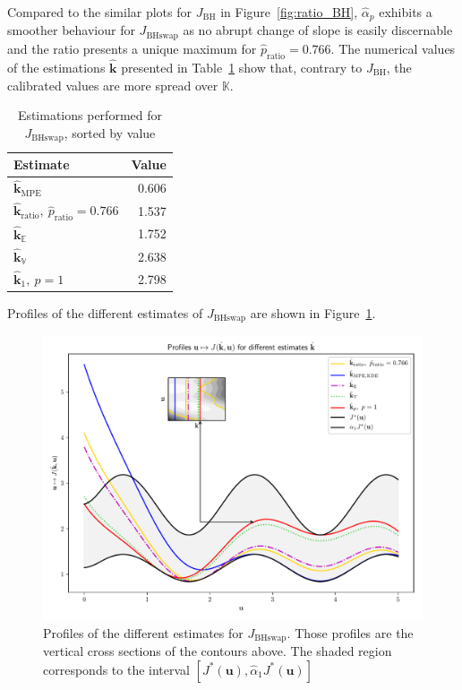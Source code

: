 \documentclass[preprint, 1p]{elsarticle}
\newcommand{\Ex}{\mathbb{E}}
\newcommand{\hatkmean}{\hat{\mathbf{k}}_{\Ex}}
\newcommand{\hatkvar}{\hat{\mathbf{k}}_{\mathbb{V}}}
\newcommand{\kest}{\hat{\mathbf{k}}}
\newcommand{\checka}{{\alpha}}
\newcommand{\Kspace}{\mathbb{K}}
\newcommand{\JBH}{J_{\mathrm{BH}}}
\newcommand{\JBHS}{J_{\mathrm{BHswap}}}
\newlength{\onehalfcolumn}
\begin{document}
Compared to the similar plots for $\JBH$ in Figure~\ref{fig:ratio_BH}, $\hat{\checka}_p$ exhibits a smoother behaviour for $\JBHS$ as no abrupt change of slope is easily discernable and the ratio presents a unique maximum for $\hat{p}_{\mathrm{ratio}}=0.766$. The numerical values of the estimations $\kest$ presented in Table~\ref{tab:recap_estimates_BHs} show that, contrary to $\JBH$, the calibrated values are more spread over $\Kspace$.

\begin{table}[!h]
\centering
\caption{Estimations performed for $\JBHS$, sorted by value}
\label{tab:recap_estimates_BHs}
\begin{tabular}{lr} \toprule
Estimate & Value \\ \midrule
$\kest_{\mathrm{MPE}}$ & 0.606 \\ 
$\kest_{\mathrm{ratio}},~ \hat{p}_{\mathrm{ratio}}=0.766$ & 1.537 \\ 
$\hatkmean$ & 1.752 \\ 
$\hatkvar$ & 2.638 \\ 
$\kest_1,~p=1$ & 2.798   \\ \bottomrule
\end{tabular}
\end{table}


Profiles of the different estimates of $\JBHS$ are shown in Figure~\ref{fig:profiles_branin_switch}.

\begin{figure}[!h]
  \centering
\includegraphics[width=\onehalfcolumn]{Figures/FIG09.pdf}
\caption{Profiles of the different estimates for $\JBHS$. Those profiles are the vertical cross sections of the contours above. The shaded region corresponds to the interval $[J^*(\mathbf{u}), \hat{\checka}_1 J^*(\mathbf{u})]$}
\label{fig:profiles_branin_switch}
\end{figure}
\end{document}
